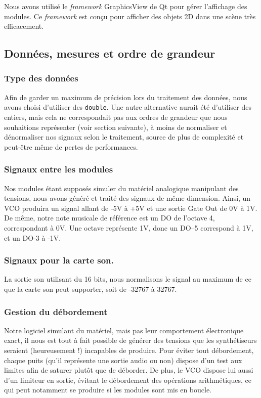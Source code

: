 Nous avons utilisé le \emph{framework} GraphicsView de Qt pour
gérer l'affichage des modules. Ce \emph{framework} est conçu pour
afficher des objets 2D dans une scène très efficacement.


\subsection{Données, mesures et ordre de grandeur}

\subsubsection{Type des données}

Afin de garder un maximum de précision lors du traitement des
données, nous avons choisi d'utiliser des \verb!double!. Une autre
alternative aurait été d'utiliser des entiers, mais cela ne
correspondait pas aux ordres de grandeur que nous souhaitions
représenter (voir section suivante), à moins de normaliser et
dénormaliser nos signaux selon le traitement, source de plus de
complexité et peut-être même de pertes de performances.

\subsubsection{Signaux entre les modules}

Nos modules étant supposés simuler du matériel analogique
manipulant des tensions, nous avons généré et traité des signaux de
même dimension. Ainsi, un VCO produira un signal allant de -5V à
+5V et une sortie Gate Out de 0V à 1V. De même, notre note musicale
de référence est un DO de l'octave 4, correspondant à 0V. Une
octave représente 1V, donc un DO--5 correspond à 1V, et un DO-3 à
-1V.

\subsubsection{Signaux pour la carte son.}

La sortie son utilisant du 16 bits, nous normalisons le signal au
maximum de ce que la carte son peut supporter, soit de -32767 à
32767.

\subsubsection{Gestion du débordement}

Notre logiciel simulant du matériel, mais pas leur comportement
électronique exact, il nous est tout à fait possible de générer des
tensions que les synthétiseurs seraient (heureusement !) incapables
de produire. Pour éviter tout débordement, chaque puits (qu'il
représente une sortie audio ou non) dispose d'un test aux limites afin de saturer
plutôt que de déborder. De plus, le VCO dispose lui aussi d'un
limiteur en sortie, évitant le débordement des opérations
arithmétiques, ce qui peut notamment se produire si les modules sont mis en boucle.

